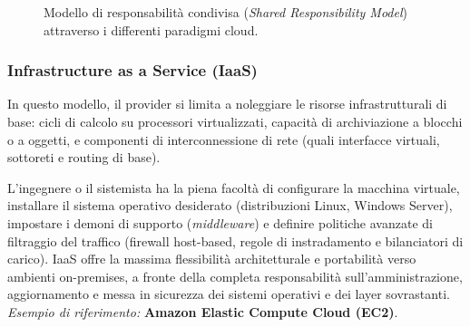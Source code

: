 \documentclass[11pt, a4paper]{article}
\begin{document}
\begin{figure}[H]
\caption{Modello di responsabilità condivisa (\emph{Shared Responsibility Model}) attraverso i differenti paradigmi cloud.}
\label{fig:shared_responsibility}
\end{figure}


\subsubsection{Infrastructure as a Service (IaaS)}
In questo modello, il provider si limita a noleggiare le risorse infrastrutturali di base: cicli di calcolo su processori virtualizzati, capacità di archiviazione a blocchi o a oggetti, e componenti di interconnessione di rete (quali interfacce virtuali, sottoreti e routing di base).

L'ingegnere o il sistemista ha la piena facoltà di configurare la macchina virtuale, installare il sistema operativo desiderato (distribuzioni Linux, Windows Server), impostare i demoni di supporto (\emph{middleware}) e definire politiche avanzate di filtraggio del traffico (firewall host-based, regole di instradamento e bilanciatori di carico). IaaS offre la massima flessibilità architetturale e portabilità verso ambienti on-premises, a fronte della completa responsabilità sull'amministrazione, aggiornamento e messa in sicurezza dei sistemi operativi e dei layer sovrastanti.
\emph{Esempio di riferimento:} \textbf{Amazon Elastic Compute Cloud (EC2)}.
\end{document}
